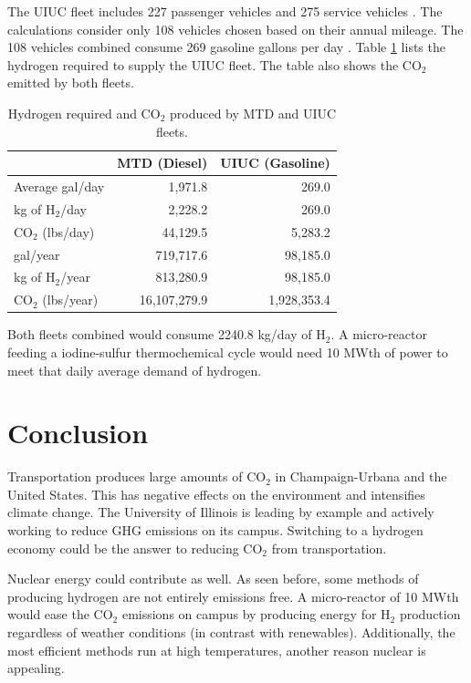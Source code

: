 \documentclass{anstrans}
\begin{document}
The UIUC fleet includes 227 passenger vehicles and 275 service vehicles \cite{noauthor_increase_2020}. The calculations consider only 108 vehicles chosen based on their annual mileage. The 108 vehicles combined consume 269 gasoline gallons per day \cite{holcomb_fueling_2015}. Table \ref{tab:h2req} lists the hydrogen required to supply the UIUC fleet. The table also shows the CO$_2$ emitted by both fleets.

\begin{table}[]
	\centering
    \caption{Hydrogen required and CO$_2$ produced by MTD and UIUC fleets.}
    \label{tab:h2req}
\begin{tabular}{l|rr}
\hline
                   & MTD (Diesel)   & UIUC (Gasoline)  \\ \hline
Average gal/day    & 1,971.8        & 269.0            \\
kg of H$_2$/day    & 2,228.2        & 269.0            \\
CO$_2$ (lbs/day)   & 44,129.5       & 5,283.2          \\
gal/year           & 719,717.6      & 98,185.0         \\
kg of H$_2$/year   & 813,280.9      & 98,185.0         \\
CO$_2$ (lbs/year)  & 16,107,279.9   & 1,928,353.4      \\ \hline
\end{tabular}
\end{table}

Both fleets combined would consume 2240.8 kg/day of H$_2$. A micro-reactor feeding a iodine-sulfur thermochemical cycle would need 10 MWth of power to meet that daily average demand of hydrogen.

\section{Conclusion}

Transportation produces large amounts of CO$_2$ in Champaign-Urbana and the United States. This has negative effects on the environment and intensifies climate change. The University of Illinois is leading by example and actively working to reduce GHG emissions on its campus. Switching to a hydrogen economy could be the answer to reducing CO$_2$ from transportation.

Nuclear energy could contribute as well. As seen before, some methods of producing hydrogen are not entirely emissions free. A micro-reactor of 10 MWth would ease the CO$_2$ emissions on campus by producing energy for H$_2$ production regardless of weather conditions (in contrast with renewables). Additionally, the most efficient methods run at high temperatures, another reason nuclear is appealing.
\end{document}
